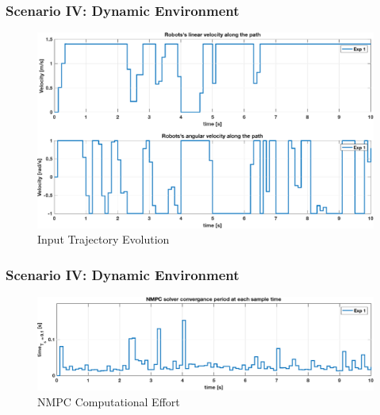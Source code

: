	\begin{frame}
		\frametitle{Scenario \textrm{IV}: Dynamic Environment}
		\begin{figure}[hbtp]
			\centering
			\includegraphics[scale=0.42]{pictures/graphs/sn3_inputs_1.eps}
			\caption{Input Trajectory Evolution}
		\end{figure}
	\end{frame}
	
	\begin{frame}
		\frametitle{Scenario \textrm{IV}: Dynamic Environment}
		\begin{figure}[hbtp]
			\centering
			\includegraphics[scale=0.42]{pictures/graphs/sn3_solver_time_1.eps}
			\caption{NMPC Computational Effort}
		\end{figure}
	\end{frame}
 
